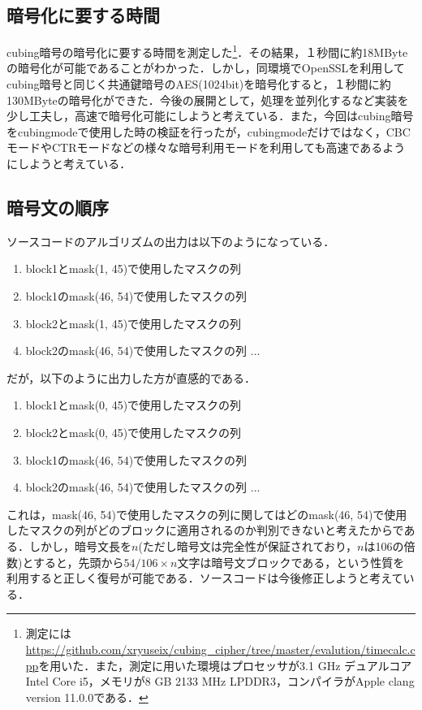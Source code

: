 \documentclass[a4j,titlepage]{jsarticle}
\begin{document}
\subsection{暗号化に要する時間}
cubing暗号の暗号化に要する時間を測定した\footnote{測定には\url{https://github.com/xryuseix/cubing_cipher/tree/master/evalution/timecalc.cpp}を用いた．また，測定に用いた環境はプロセッサが3.1 GHz デュアルコアIntel Core i5，メモリが8 GB 2133 MHz LPDDR3，コンパイラがApple clang version 11.0.0である．}．その結果，１秒間に約18MByteの暗号化が可能であることがわかった．しかし，同環境でOpenSSLを利用してcubing暗号と同じく共通鍵暗号のAES(1024bit)を暗号化すると，１秒間に約130MByteの暗号化ができた．今後の展開として，処理を並列化するなど実装を少し工夫し，高速で暗号化可能にしようと考えている．また，今回はcubing暗号をcubingmodeで使用した時の検証を行ったが，cubingmodeだけではなく，CBCモードやCTRモードなどの様々な暗号利用モードを利用しても高速であるようにしようと考えている．

\subsection{暗号文の順序}
ソースコードのアルゴリズムの出力は以下のようになっている．\\
\begin{screen}
  \begin{enumerate}
    \item block1とmask(\phantom{0}1, 45)で使用したマスクの列
    \item block1のmask(46, 54)で使用したマスクの列
    \item block2とmask(\phantom{0}1, 45)で使用したマスクの列
    \item block2のmask(46, 54)で使用したマスクの列 ...
  \end{enumerate}
\end{screen}
だが，以下のように出力した方が直感的である．
\begin{screen}
  \begin{enumerate}
    \item block1とmask(\phantom{0}0, 45)で使用したマスクの列
    \item block2とmask(\phantom{0}0, 45)で使用したマスクの列
    \item block1のmask(46, 54)で使用したマスクの列
    \item block2のmask(46, 54)で使用したマスクの列 ...
  \end{enumerate}
\end{screen}
これは，mask(46, 54)で使用したマスクの列に関してはどのmask(46, 54)で使用したマスクの列がどのブロックに適用されるのか判別できないと考えたからである．しかし，暗号文長を\(n\)(ただし暗号文は完全性が保証されており，\(n\)は106の倍数)とすると，先頭から\(54/106 \times n\)文字は暗号文ブロックである，という性質を利用すると正しく復号が可能である．ソースコードは今後修正しようと考えている．
\end{document}
